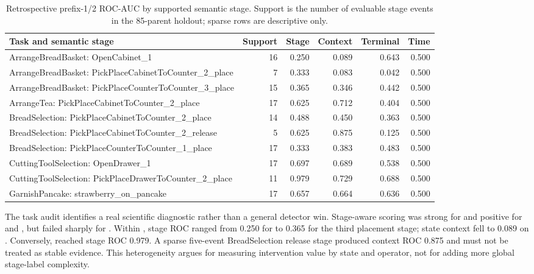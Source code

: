 \begin{table}[H]
\centering
\caption{Retrospective prefix-1/2 ROC-AUC by supported semantic stage. Support is the number of evaluable stage events in the 85-parent holdout; sparse rows are descriptive only.}
\label{tab:phase1-context-by-stage}
\scriptsize
\begin{tabularx}{\textwidth}{Y rrrrr}
\toprule
Task and semantic stage & Support & Stage & Context & Terminal & Time \\
\midrule
ArrangeBreadBasket: OpenCabinet\_1 & 16 & 0.250 & 0.089 & 0.643 & 0.500 \\
ArrangeBreadBasket: PickPlaceCabinetToCounter\_2\_place & 7 & 0.333 & 0.083 & 0.042 & 0.500 \\
ArrangeBreadBasket: PickPlaceCounterToCounter\_3\_place & 15 & 0.365 & 0.346 & 0.442 & 0.500 \\
ArrangeTea: PickPlaceCabinetToCounter\_2\_place & 17 & 0.625 & 0.712 & 0.404 & 0.500 \\
BreadSelection: PickPlaceCabinetToCounter\_2\_place & 14 & 0.488 & 0.450 & 0.363 & 0.500 \\
BreadSelection: PickPlaceCabinetToCounter\_2\_release & 5 & 0.625 & 0.875 & 0.125 & 0.500 \\
BreadSelection: PickPlaceCounterToCounter\_1\_place & 17 & 0.333 & 0.383 & 0.483 & 0.500 \\
CuttingToolSelection: OpenDrawer\_1 & 17 & 0.697 & 0.689 & 0.538 & 0.500 \\
CuttingToolSelection: PickPlaceDrawerToCounter\_2\_place & 11 & 0.979 & 0.729 & 0.688 & 0.500 \\
GarnishPancake: strawberry\_on\_pancake & 17 & 0.657 & 0.664 & 0.636 & 0.500 \\
\bottomrule
\end{tabularx}
\end{table}

The task audit identifies a real scientific diagnostic rather than a general detector win. Stage-aware scoring was strong for  and positive for  and , but failed sharply for . Within , stage ROC ranged from 0.250 for  to 0.365 for the third placement stage; state context fell to 0.089 on . Conversely,  reached stage ROC 0.979. A sparse five-event BreadSelection release stage produced context ROC 0.875 and must not be treated as stable evidence. This heterogeneity argues for measuring intervention value by state and operator, not for adding more global stage-label complexity.

